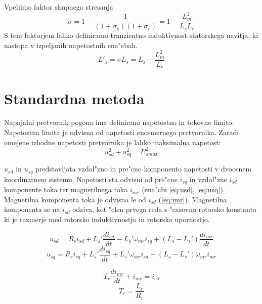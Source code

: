 \documentclass[journal,a4paper,twoside]{sty/IEEEtran}
\begin{document}
Vpeljimo faktor skupnega stresanja
\begin{equation}
\sigma=1-\frac{1}{(1+\sigma_s)(1+\sigma_r)}=1-\frac{L_m^2}{L_sL_r}
\end{equation}
S  tem faktorjem lahko definiramo tranzientno induktivnost statorskega navitja, ki nastopa v  izpeljanih napetostnih ena"cbah.
\begin{equation}
L'_s=\sigma L_s= L_s- \frac{L_m^2}{L_r}
\end{equation}



\section{Standardna metoda}
Napajalni pretvornik pogona ima definirano napetostno in tokovno limito. Napetostna limita je odvisna od napetosti enosmernega pretvornika.\cite{vas}
Zaradi omejene izhodne napetosti pretvornika je lahko maksimalna napetost:
\begin{equation}
u_{sd}^2+u_{sq}^2= U_{smax}^2
\label{eq:napetostna_limita_osnovna}
\end{equation}

$u_{sd}$ in $u_{sq}$ predstavljata vzdol"zno in pre"cno komponento  napetosti v dvoosnem koordinatnem sistemu. Napetosti sta odvisni od pre"cne $i_{sq}$ in vzdol"zne $i_{sd}$ komponente toka ter magnetilnega  toka $i_{mr}$ (ena"cbi \ref{eq:usd}, \ref{eq:usq}). Magnetilna komponenta toka je odvisna le od $i_{sd}$ (\ref{eq:imr}). Magnetilna komponenta se na $i_{sd}$ odziva, kot "clen prvega reda s "casovno rotorsko konstanto ki je razmerje  med rotorsko induktivnostjo in rotorsko upornostjo.\cite{servopogoni}

\begin{equation}
u_{sd}= R_s i_{sd}+L_s' \frac{di_{sd}}{dt}- L_s' \omega_{mr} i_{sq}+(L_s-L_s')\frac{di_{mr}}{dt}
\label{eq:usd}
\end{equation}
\begin{equation}
u_{sq}= R_s i_{sq}+L_s' \frac{di_{sq}}{dt} + L_s' \omega_{mr}i_{sd}+(L_s-L_s')\omega_{mr}i_{mr}
\label{eq:usq}
\end{equation}

\begin{equation}
T_r\frac{di_{mr}}{dt}+i_{mr} =i_{sd}
\label{eq:imr}
\end{equation}
\begin{equation}
T_r=\frac{L_r}{R_r}
\label{eq:Tr}
\end{equation}
\end{document}
